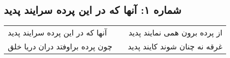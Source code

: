 \begin{center}
\section*{شماره ۱: آنها که در این پرده سرایند پدید}
\label{sec:001}
\begin{longtable}{l p{0.5cm} r}
آنها که در این پرده سرایند پدید
&&
از پرده برون همی نمایند پدید
\\
چون پرده براوفتد دران دریا خلق
&&
غرقه نه چنان شوند کایند پدید
\\
\end{longtable}
\end{center}
